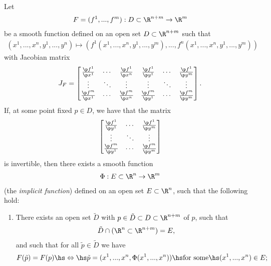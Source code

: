 \documentclass{article}
\begin{document}
\begin{theorem}
	Let
	\begin{align*}
		F = (f^1,...,f^m):D\subset \R^{n+m}\to\R^m \\
	\end{align*}
	be a smooth function defined on an open set $D\subset\R^{n+m}$ such that
	\begin{align*}
		(x^1,...,x^n,y^1,...,y^n)\mapsto (f^1(x^1,...,x^n,y^1,...,y^m), ..., f^n(x^1,...,x^n,y^1,...,y^m))
	\end{align*}
	with Jacobian matrix
	\begin{align*}
		J_F = \begin{bmatrix}
			\frac{\p f^1}{\p x^1} & \cdots & \frac{\p f^1}{\p x^n} & \frac{\p f^1}{\p y^1} & \cdots & \frac{\p f^1}{\p y^m} \\
			\vdots                & \ddots & \vdots                & \vdots                & \ddots & \vdots                \\
			\frac{\p f^m}{\p x^1} & \cdots & \frac{\p f^m}{\p x^n} & \frac{\p f^m}{\p y^1} & \cdots & \frac{\p f^m}{\p y^m}
		\end{bmatrix}.
	\end{align*}
	If, at some point fixed $p\in D$, we have that the matrix
	\begin{align*}
		\begin{bmatrix}
			\frac{\p f^1}{\p y^1} & \cdots & \frac{\p f^1}{\p y^m} \\
			\vdots                & \ddots & \vdots                \\
			\frac{\p f^m}{\p y^1} & \cdots & \frac{\p f^m}{\p y^m}
		\end{bmatrix}
	\end{align*}
	is invertible,
	then there exists a smooth function
	\begin{align*}
		\Phi : E \subset \R^n \to \R^m
	\end{align*}
	(the \emph{implicit function}) defined on an open set $E\subset \R^n$, such that
	the following hold:
	\begin{enumerate}
		\item There exists an open set $\tilde D$ with $p\in \tilde D\subset D\subset\R^{n+m}$ of $p$, such that  \begin{align*}
			      \tilde D \cap (\R^n\subset\R^{n+m})=E,
		      \end{align*}
		      and such that for all $\tilde p\in\tilde D$ we have \begin{align*}
			      F(\tilde p) = F(p) \hs\Leftrightarrow\hs \tilde p =(x^1,...,x^n,\Phi(x^1,...,x^n)) \hs\text{for some}\hs (x^1,...,x^n)\in E;

\end{align*}
\end{enumerate}
\end{theorem}
\end{document}
